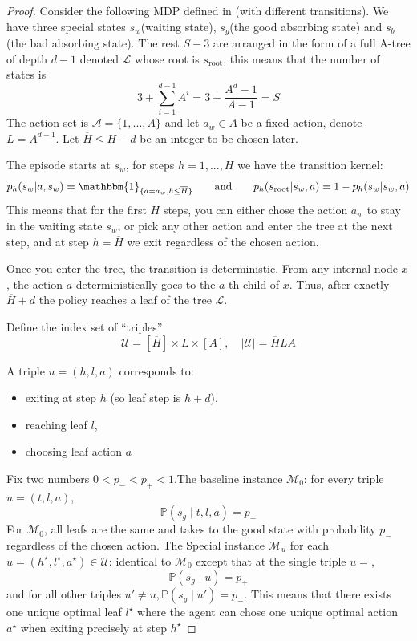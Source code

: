 \documentclass[final,12pt]{colt2026} %
\begin{document}
\begin{proof}
Consider the following MDP defined in \citep{domingues2021episodic}(with different transitions). We have three special states $s_w$(waiting state), $s_g$(the good absorbing state) and $s_b$(the bad absorbing state). The rest $S-3$ are arranged in the form of a full A-tree of depth $d - 1$ denoted $\mathcal{L}$ whose root is $s_{\text{root}}$, this means that the number of states is 
$$3 +\sum_{i=1}^{d-1} A^i = 3 + \frac{A^d - 1}{A  -1} = S$$
The action set is $\mathcal{A} = \{1,...,A\}$ and let $a_w \in A$ be a fixed action, denote $L = A^{d-1}$. Let $\overline{H} \leq H-d$ be an integer to be chosen later.

The episode starts at $s_w$, for steps $h = 1,...,\overline{H}$ we have the transition kernel:
$$p_h(s_w|a,s_w) =  \mathbbm{1}_{\{a = a_w, h \leq \overline{H}\}} \quad \quad \text{and} \quad \quad p_h(s_{\text{root}}|s_w,a) = 1 - p_h(s_w|s_w,a)$$
This means that for the first $\overline{H}$ steps, you can either chose the action $a_w$ to stay in the waiting state $s_w$, or pick any other action and enter the tree at the next step, and at step $h = \overline{H}$ we exit regardless of the chosen action.

Once you enter the tree, the transition is deterministic. From any internal node $x$, the action $a$ deterministically goes to the $a$-th child of $x$. Thus, after exactly $\overline{H} + d$ the policy reaches a leaf of the tree $\mathcal{L}$. 

Define the index set of ``triples''
$$
\mathcal{U} = [\overline{H}] \times L \times [A], \quad |\mathcal{U}| = \overline{H}  L  A
$$

A triple $u = (h, l, a)$ corresponds to:
\begin{itemize}
    \item exiting at step $h$ (so leaf step is $h + d$),
    \item reaching leaf $l$,
    \item choosing leaf action $a$
\end{itemize}

Fix two numbers $0 < p_- < p_+ < 1$.The baseline instance $\mathcal{M}_0$: for every triple $u = (t, l, a)$,
$$
\mathbb{P}(s_g \mid t, l, a) = p_-
$$
For $\mathcal{M}_0$, all leafs are the same and takes to the good state with probability $p_-$ regardless of the chosen action.
The Special instance $\mathcal{M}_u$ for each $u =(h^\star,l^\star,a^\star) \in \mathcal{U}$: identical to $\mathcal{M}_0$ except that at the single triple $u = $,
$$
\mathbb{P}(s_g \mid u) = p_+
$$
and for all other triples $u' \neq u, \mathbb{P}(s_g \mid u') = p_-$. This means that there exists one unique optimal leaf $l^\star$ where the agent can chose one unique optimal action $a^\star$ when exiting precisely at step $h^\star$ 


\end{proof}
\end{document}
